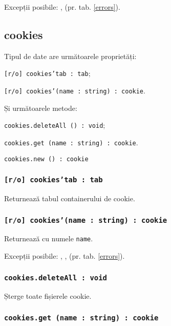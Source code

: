 Excepții posibile: ,  (pr. tab. \ref{errors}).

\subsection{{\color{orange} cookies}}

Tipul de date \cookies{} are următoarele proprietăți:
\begin{icItems}
	\item \texttt{[r/o] cookies'tab : tab};
	\item \texttt{[r/o] cookies'(name : string) : cookie}.
\end{icItems}

Și următoarele metode: 
\begin{icItems}
	\item \texttt{cookies.deleteAll () : void};
	\item \texttt{cookies.get (name : string) : cookie}.
	\item \texttt{cookies.new () : cookie}
\end{icItems}

\subsubsection{\texttt{[r/o] cookies'tab : tab}}

Returnează tabul containerului de cookie.

\subsubsection{\texttt{[r/o] cookies'(name : string) : cookie}}

Returnează \cookie{} cu numele \texttt{name}.

Excepții posibile: , ,  (pr. tab. \ref{errors}).

\subsubsection{\texttt{cookies.deleteAll : void}}

Șterge toate fișierele cookie.

\subsubsection{\texttt{cookies.get (name : string) : cookie}}

